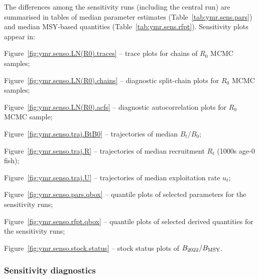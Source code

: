\documentclass[11pt]{book}
\newcommand{\Bmsy}{B_\mathrm{MSY}}
\begin{document}
The differences among the sensitivity runs (including the central run) are summarised in tables of median parameter estimates (Table~\ref{tab:ymr.sens.pars}) and median MSY-based quantities (Table~\ref{tab:ymr.sens.rfpt}).
Sensitivity plots appear in:
\vspace{-0.5\baselineskip}%
\begin{itemize_csas}
  \item Figure~\ref{fig:ymr.senso.LN(R0).traces} -- trace plots for chains of $R_0$ MCMC samples;
  \item Figure~\ref{fig:ymr.senso.LN(R0).chains} -- diagnostic split-chain plots for $R_0$ MCMC samples;
  \item Figure~\ref{fig:ymr.senso.LN(R0).acfs} -- diagnostic autocorrelation plots for $R_0$ MCMC sample;
  \item Figure~\ref{fig:ymr.senso.traj.BtB0} -- trajectories of median $B_t/B_0$;
  \item Figure~\ref{fig:ymr.senso.traj.R} -- trajectories of  median recruitment $R_t$ (1000s age-0 fish);
  \item Figure~\ref{fig:ymr.senso.traj.U} -- trajectories of median exploitation rate $u_t$;
  \item Figure~\ref{fig:ymr.senso.pars.qbox} -- quantile plots of selected parameters for the sensitivity runs;
  \item Figure~\ref{fig:ymr.senso.rfpt.qbox} -- quantile plots of selected derived quantities for the sensitivity runs;
  \item Figure~\ref{fig:ymr.senso.stock.status} -- stock status plots of $B_{\currYear}/\Bmsy$.
 \end{itemize_csas}

\subsubsection{Sensitivity diagnostics}
\end{document}
